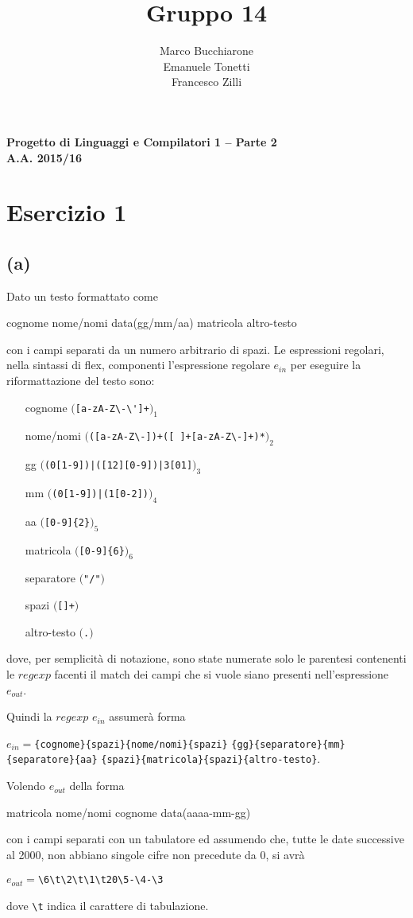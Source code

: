 \documentclass[a4paper,oneside,11pt]{article}
\makeatletter
\renewcommand\and{\\}
\renewcommand\maketitle{%
\bigskip\bigskip\bigskip\bigskip%
\begin{center}\bfseries\large%
Progetto di Linguaggi e Compilatori 1 -- Parte 2 \\ A.A. 2015/16\\%
\end{center}%
\bigskip%
\begin{center}\bfseries\LARGE \@title  \end{center}%
\bigskip%
\begin{center}\bfseries\large \@author \end{center}%
\bigskip\bigskip}
\makeatother
\begin{document}
\title{Gruppo 14}
\author{Marco Bucchiarone \and Emanuele Tonetti \and Francesco Zilli}
\maketitle
%
\section*{Esercizio 1}
\subsection*{(a)}
Dato un testo formattato come 
\begin{center}
cognome  nome/nomi  data(gg/mm/aa)  matricola  altro-testo
\end{center}
con i campi separati da un numero arbitrario di spazi.
Le espressioni regolari, nella sintassi di flex, componenti l'espressione regolare $e_{in}$ per eseguire la riformattazione del testo sono:
\begin{itemize}
	\item[cognome]		$($\Verb/[a-zA-Z\-\']+/$)_{1}$
	\item[nome/nomi]	$($\Verb/([a-zA-Z\-])+([ ]+[a-zA-Z\-]+)*/$)_{2}$
	\item[gg]		$($\Verb/(0[1-9])|([12][0-9])|3[01]/$)_{3}$ 
	\item[mm]		$($\Verb/(0[1-9])|(1[0-2])/$)_{4}$ 
	\item[aa]		$($\Verb/[0-9]{2}/$)_{5}$ 
	\item[matricola]	$($\Verb/[0-9]{6}/$)_{6}$ 
	\item[separatore]	$($\Verb!"/"!$)$ 
	\item[spazi]		$($\texttt{[\textvisiblespace]+}$)$
	\item[altro-testo]	$($\Verb/./$)$ 
\end{itemize}
dove, per semplicità di notazione, sono state numerate solo le parentesi contenenti le $regexp$ facenti il match dei campi che si vuole siano presenti nell'espressione $e_{out}$.
\newpage
\par
Quindi la $regexp$ $e_{in}$ assumerà forma
\begin{center}
$e_{in} =$\Verb!{cognome}!\Verb!{spazi}!\Verb!{nome/nomi}!\Verb!{spazi}!
\Verb!{gg}!\Verb!{separatore}!\Verb!{mm}!\Verb!{separatore}!\Verb!{aa}!
\Verb!{spazi}!\Verb!{!\Verb!matricola}!\Verb!{spazi}!\Verb!{altro-testo}!.
\end{center}
\par
Volendo $e_{out}$ della forma
\begin{center}
	matricola nome/nomi cognome data(aaaa-mm-gg)
\end{center}
con i campi separati con un tabulatore ed assumendo che, tutte le date successive al 2000, non abbiano singole cifre non precedute da 0, si avrà
\begin{center}
	$e_{out}=$\Verb!\6\t\2\t\1\t20\5-\4-\3!
\end{center}
dove \Verb!\t! indica il carattere di tabulazione.
\end{document}
